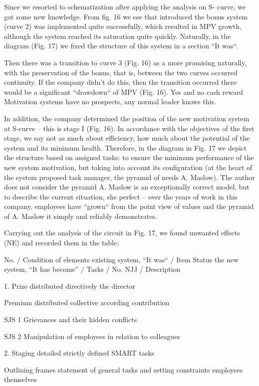 \documentclass[11pt,a4paper]{book}
\begin{document}
Since we resorted to schematization after applying the analysis on S- curve,
we got some new knowledge. From fig. 16 we see that introduced the bonus
system (curve 2) was implemented quite successfully, which resulted in MPV
growth, although the system reached its saturation quite quickly.  Naturally,
in the diagram (Fig. 17) we fixed the structure of this system in a section
“It was“.

Then there was a transition to curve 3 (Fig. 16) as a more promising
naturally, with the preservation of the bonus, that is, between the two curves
occurred continuity. If the company didn’t do this, then the transition
occurred there would be a significant “drawdown“ of MPV (Fig. 16). Yes and no
cash reward Motivation systems have no prospects, any normal leader knows
this.

In addition, the company determined the position of the new motivation system
at S-curve -- this is stage I (Fig. 16). In accordance with the objectives of
the first stage, we say not as much about efficiency, how much about the
potential of the system and its minimum health. Therefore, in the diagram in
Fig. 17 we depict the structure based on assigned tasks: to ensure the minimum
performance of the new system motivation, but taking into account its
configuration (at the heart of the system proposed task manager, the pyramid
of needs A. Maslow). The author does not consider the pyramid A. Maslow is an
exceptionally correct model, but to describe the current situation, she
perfect -- over the years of work in this company, employees have “grown“ from
the point view of values and the pyramid of A. Maslow it simply and reliably
demonstrates.

Carrying out the analysis of the circuit in Fig. 17, we found unwanted effects
(NE) and recorded them in the table:


No. / Condition of elements existing system, “It was“ / Item Status the new
system, “It has become” / Tasks / No.  NJJ / Description

1.  Prize distributed directively the director

Premium distributed collective according contribution

SJS 1 Grievances and their hidden conflicts

SJS 2 Manipulation of employees in relation to colleagues

2. Staging detailed strictly defined SMART tasks

Outlining frames statement of general tasks and setting constraints employees
themselves
\end{document}
